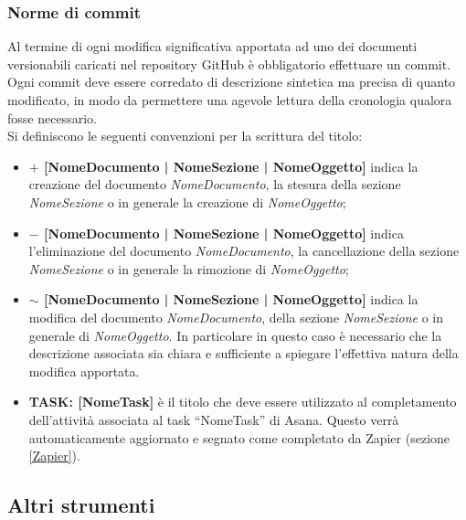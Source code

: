 \documentclass[../NormeDiProgetto.tex]{subfiles}
\begin{document}
		\subsubsection{Norme di commit}
			Al termine di ogni modifica significativa apportata ad uno dei documenti versionabili caricati nel
			repository GitHub è obbligatorio effettuare un commit. Ogni commit deve essere corredato di
			descrizione sintetica ma precisa di quanto modificato, in modo da permettere una agevole lettura
			della cronologia qualora fosse necessario.\\
			Si definiscono le seguenti convenzioni per la scrittura del titolo:
			\begin{itemize}
				\item \textbf{$ + $ [NomeDocumento | NomeSezione | NomeOggetto]} indica la creazione del
				documento \textit{NomeDocumento}, la stesura della sezione \textit{NomeSezione} o in generale
				la creazione di \textit{NomeOggetto};
				\item \textbf{$ - $ [NomeDocumento | NomeSezione | NomeOggetto]} indica l'eliminazione del
				documento \textit{NomeDocumento}, la cancellazione della sezione \textit{NomeSezione} o in
				generale la rimozione di \textit{NomeOggetto};
				\item \textbf{$ \sim $ [NomeDocumento | NomeSezione | NomeOggetto]} indica la modifica del
				documento \textit{NomeDocumento}, della sezione \textit{NomeSezione} o in generale di
				\textit{NomeOggetto}. In particolare in questo caso è necessario che la descrizione associata
				sia chiara e sufficiente a spiegare l'effettiva natura della modifica apportata.
				\item \textbf{TASK: [NomeTask]} è il titolo che deve essere utilizzato al completamento
				dell'attività associata al task ``NomeTask'' di Asana. Questo verrà automaticamente aggiornato
				e segnato come completato da Zapier (sezione \ref{Zapier}).
			\end{itemize}
		\subsection{Altri strumenti}
\end{document}
